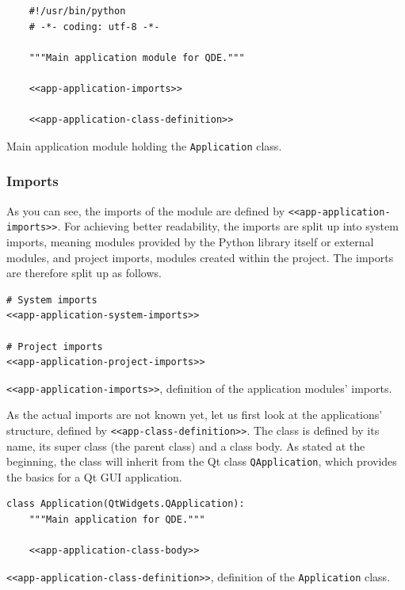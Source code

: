 \documentclass[10pt, openright, notitlepage]{scrreprt}
\begin{document}
\begin{listing}[H]
\begin{verbatim}
    #!/usr/bin/python
    # -*- coding: utf-8 -*-
    
    """Main application module for QDE."""
    
    <<app-application-imports>>
    
    <<app-application-class-definition>>
\end{verbatim}
\caption{Main application module holding the \texttt{Application} class.}
\end{listing}

\subsubsection{Imports}
\label{sec:orgb88c9f1}
As you can see, the imports of the module are defined by \texttt{<<app-application-imports>>}. For
achieving better readability, the imports are split up into system imports,
meaning modules provided by the Python library itself or external modules, and
project imports, modules created within the project. The imports are therefore
split up as follows.

\begin{listing}[H]
\begin{verbatim}
# System imports
<<app-application-system-imports>>

# Project imports
<<app-application-project-imports>>
\end{verbatim}
\caption{\label{app-application-imports}
\texttt{<<app-application-imports>>}, definition of the application modules' imports.}
\end{listing}

As the actual imports are not known yet, let us first look at the applications'
structure, defined by \texttt{<<app-class-definition>>}. The class is defined by its
name, its super class (the parent class) and a class body. As stated at the
beginning, the class will inherit from the Qt class \texttt{QApplication}, which
provides the basics for a Qt GUI application.

\begin{listing}[H]
\begin{verbatim}
class Application(QtWidgets.QApplication):
    """Main application for QDE."""

    <<app-application-class-body>>
\end{verbatim}
\caption{\label{app-application-class-definition}
\texttt{<<app-application-class-definition>>}, definition of the \texttt{Application} class.}
\end{listing}
\end{document}

